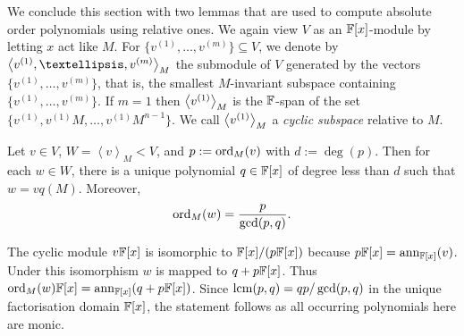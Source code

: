 \smallskip
We conclude this section with two lemmas that are used to
compute absolute order polynomials using relative ones. We again
view $V$ as an $\mathbb{F}[x]$-module by letting $x$ act like $M$. For
$\{v^{(1)},\dots,v^{(m)}\} \subseteq V$, we denote by $\la
v^{(1)},\dots,v^{(m)}\ra_M$ the submodule of $V$ generated
by the vectors $\{v^{(1)},\dots,v^{(m)}\}$, that is, the smallest $M$-invariant
subspace containing $\{v^{(1)},\dots,v^{(m)}\}$. If $m=1$ then $\left<
v^{(1)}\right>_M$ is the $\mathbb{F}$-span of the set $\{v^{(1)},v^{(1)}M,\dots,
v^{(1)}M^{n-1}\}$. We call $\left< v^{(1)}\right>_M$ a \emph{cyclic
subspace} relative to $M$.

\begin{Lemm}
\label{ordpolcyclic}
Let $v\in V$, $W = \left< v \right>_M < V$, and
$p := \mathrm{ord}_M(v)$ with $d := \deg(p)$. 
Then for each $w \in W$, there is a unique polynomial
$q \in \mathbb{F}[x]$ of degree less than $d$ such that $w = vq(M)$.
Moreover,
\[ \mathrm{ord}_M(w) = \frac{p}{\gcd(p,q)}. \]
\end{Lemm}
%
%

%
\proofbeg The cyclic module $v\mathbb{F}[x]$ is isomorphic
to $\mathbb{F}[x]/(p\mathbb{F}[x])$ because $p\mathbb{F}[x] = \mathrm{ann}_{\mathbb{F}[x]}(v)$. Under this isomorphism
$w$ is mapped to $q+p\mathbb{F}[x]$. Thus 
$\mathrm{ord}_M(w)\mathbb{F}[x] = \mathrm{ann}_{\mathbb{F}[x]}(q+p\mathbb{F}[x])$. Since $\mathrm{lcm}(p,q) = qp/\gcd(p,q)$
in the unique factorisation domain $\mathbb{F}[x]$, the statement follows
as all occurring polynomials here are monic.
\proofend

